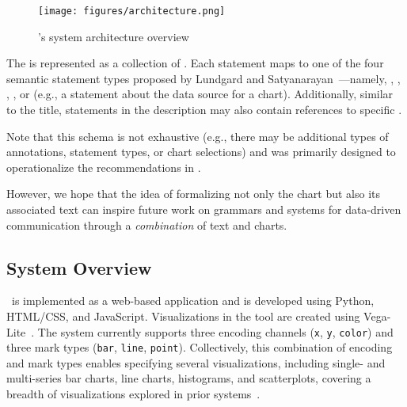 \begin{figure}[t!]
    \centering    
    \texttt{[image: figures/architecture.png]}
    \caption{\pluto's system architecture overview}
    \label{fig:architecture}
\end{figure}

The  is represented as a collection of .
Each statement maps to one of the four semantic statement types proposed by Lundgard and Satyanarayan~\cite{lundgard2021accessible}---namely, , , , , or   (e.g., a statement about the data source for a chart).
Additionally, similar to the title, statements in the description may also contain references to specific .

Note that this schema is not exhaustive (e.g., there may be additional types of annotations, statement types, or chart selections) and was primarily designed to operationalize the recommendations in \pluto.

However, we hope that the idea of formalizing not only the chart but also its associated text can inspire future work on grammars and systems for data-driven communication through a \emph{combination} of text and charts.

\subsection{System Overview}

\pluto~is implemented as a web-based application and is developed using Python, HTML/CSS, and JavaScript.
Visualizations in the tool are created using Vega-Lite~\cite{satyanarayan2016vega}.
The system currently supports three encoding channels (\texttt{x}, \texttt{y}, \texttt{color}) and three mark types (\texttt{bar}, \texttt{line}, \texttt{point}).
Collectively, this combination of encoding and mark types enables specifying several visualizations, including single- and multi-series bar charts, line charts, histograms, and scatterplots, covering a breadth of visualizations explored in prior systems~\cite{kim2023emphasischecker,latif2021kori,sultanum2023datatales,kim2024datadive,choi2022intentable,obeid2020chart,liu2020autocaption,hsu2021scicap,alam2023seechart}.

